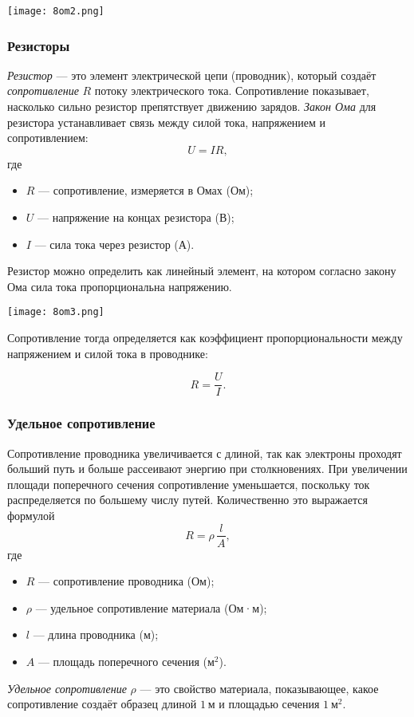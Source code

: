 \documentclass[12pt, a4paper]{article}%
\begin{document}
\begin{center}
\texttt{[image: 8om2.png]}
\label{fig:mpr}
\end{center}

\subsubsection*{Резисторы}

\textit{Резистор} — это элемент электрической цепи (проводник), который создаёт \textit{сопротивление} $R$ потоку электрического тока. Сопротивление показывает, насколько сильно резистор препятствует движению зарядов. \textit{Закон Ома} для резистора устанавливает связь между силой тока, напряжением и сопротивлением:
\[
U = IR,
\]
где
\begin{itemize}
  \item $R$ — сопротивление, измеряется в Омах (Ом);
  \item $U$ — напряжение на концах резистора (В);
  \item $I$ — сила тока через резистор (А).
\end{itemize}

Резистор можно определить как линейный элемент, на котором согласно закону Ома сила тока пропорциональна напряжению. 


\begin{center}
\texttt{[image: 8om3.png]}
\label{fig:mpr}
\end{center}

Сопротивление тогда определяется как коэффициент пропорциональности между напряжением и силой тока в проводнике:



\[

R = \frac{U}{I}.
\]

\subsubsection*{Удельное сопротивление}
Сопротивление проводника увеличивается с длиной, так как электроны проходят больший путь и больше рассеивают энергию при 
столкновениях. При увеличении площади поперечного сечения сопротивление уменьшается, поскольку ток распределяется
по большему числу путей. Количественно это выражается формулой
\[
R=\rho\,\frac{l}{A},
\]
где
\begin{itemize}
  \item $R$ — сопротивление проводника (Ом);
  \item $\rho$ — удельное сопротивление материала (Ом·м);
  \item $l$ — длина проводника (м);
  \item $A$ — площадь поперечного сечения (м$^2$).
\end{itemize}
\textit{Удельное сопротивление} $\rho$ — это свойство материала, показывающее, какое сопротивление создаёт образец длиной $1$ м и площадью 
сечения $1$ м$^2$. 
\end{document}
